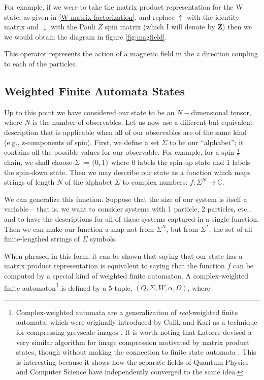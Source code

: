 \documentclass{amsbook}
\theoremstyle{plain}
\theoremstyle{definition}
\theoremstyle{remark}
\newcommand{\half}{\frac{1}{2}}
\begin{document}
For example, if we were to take the matrix product representation for the W state, as given in \eqref{W-matrix-factorization}, and replace $\uparrow$ with the identity matrix and $\downarrow$ with the Pauli $Z$ spin matrix (which I will denote by \textbf{Z}) then we we would obtain the diagram in figure \ref{fig:magfield}.

This operator represents the action of a magnetic field in the $z$ direction coupling to each of the particles.
\subsection{Weighted Finite Automata States}

Up to this point we have considered our state to be an $N-$dimensional tensor, where $N$ is the number of observables.  Let us now use a different but equivalent description that is applicable when all of our observables are of the same kind (e.g., z-components of spin).  First, we define a set $\Sigma$ to be our ``alphabet'';  it contains all the possible values for our observable.  For example, for a spin-$\half$ chain, we shall choose $\Sigma:=\{0,1\}$ where $0$ labels the spin-up state and $1$ labels the spin-down state.  Then we may describe our state as a function which maps strings of length $N$ of the alphabet $\Sigma$ to complex numbers:  $f: \Sigma^N\to \mathbb{C}$.

We can generalize this function.  Suppose that the size of our system is itself a variable -- that is, we want to consider systems with 1 particle, 2 particles, etc., and to have the descriptions for all of these systems captured in a single function.  Then we can make our function a map not from $\Sigma^N$, but from $\Sigma^*$, the set of all finite-lengthed strings of $\Sigma$ symbols.

When phrased in this form, it can be shown that saying that our state has a matrix product representation is equivalent to saying that the function $f$ can be computed by a special kind of weighted finite automaton.  A complex-weighted finite automaton\footnote{Complex-weighted automata are a generalization of \textit{real}-weighted finite automata, which were originally introduced by Culik and Kari as a technique for compressing greyscale images \cite{II:1993fk} \cite{II:fk} \cite{Jiang:2003wd}.  It is worth noting that Latorre devised a very similar algorithm for image compression motivated by matrix product states, though without making the connection to finite state automata \cite{quant-ph/0510031}.  This is interesting because it shows how the separate fields of Quantum Physics and Computer Science have independently converged to the same idea.} is defined by a 5-tuple, $(Q,\Sigma,W,\alpha,\Omega)$, where
\end{document}
